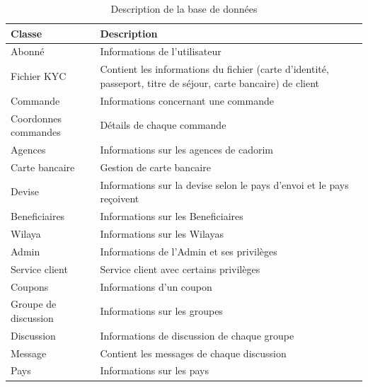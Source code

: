 \begin{table}[h]
	\hspace*{-2cm}
	\begin{tabular}{|m{5cm}|m{14cm}|}
		\hline
			\textbf{Classe}& \textbf{Description}
		\\
		\hline
		Abonné&Informations de l'utilisateur
		\\
		\hline
		Fichier KYC&  Contient les informations du fichier (carte d'identité, passeport, titre de séjour, carte bancaire) de client
		\\
			\hline
		Commande& Informations concernant une commande
		\\
			\hline
		Coordonnes commandes& Détails de chaque commande
		\\
			\hline
		Agences& Informations sur les agences de cadorim
		\\
			\hline
		Carte bancaire& Gestion de carte bancaire\\
		\hline	
			Devise& Informations sur la devise selon le pays d'envoi et le pays reçoivent
		\\
		\hline
			Beneficiaires&Informations sur les Beneficiaires
		\\
		\hline	
			Wilaya&Informations sur les Wilayas
		\\
		\hline	
			Admin&Informations de l’Admin et ses privilèges
		\\
		\hline	
			Service client&Service client avec certains privilèges
		\\
		\hline	
			Coupons&Informations d’un coupon
		\\
		\hline	
			Groupe de discussion&Informations sur les groupes
		\\
		\hline	
			Discussion&Informations de discussion de chaque groupe
		\\
		\hline		
			Message&Contient les messages de chaque discussion
		\\
		\hline
			Pays&Informations sur les pays
		\\
		\hline		
	\end{tabular}
	\centering \caption{Description de la base de données}
	\label{fig4:classT}
\end{table}


